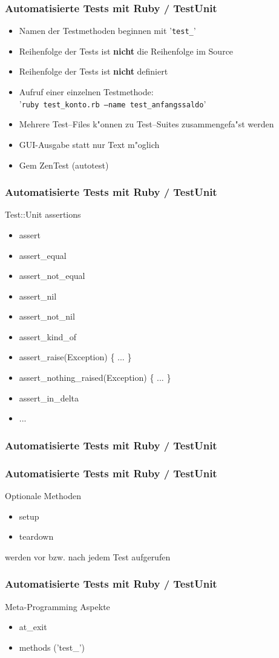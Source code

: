 \documentclass{beamer}
\begin{document}
\begin{frame}
  \frametitle{Automatisierte Tests mit Ruby / TestUnit}
  \begin{itemize}
    \item Namen der Testmethoden beginnen mit '\texttt{test\_}'
    \item Reihenfolge der Tests ist {\bf nicht} die Reihenfolge im Source
    \item Reihenfolge der Tests ist {\bf nicht} definiert
    \item Aufruf einer einzelnen Testmethode:\\ '\texttt{ruby test\_konto.rb --name test\_anfangssaldo}'
    \item Mehrere Test--Files k"onnen zu Test--Suites zusammengefa"st werden
    \item GUI-Ausgabe statt nur Text m"oglich
    \item Gem ZenTest (autotest)
  \end{itemize}
\end{frame}

\begin{frame}
  \frametitle{Automatisierte Tests mit Ruby / TestUnit}
  Test::Unit assertions
  \begin{itemize}
    \item assert
    \item assert\_equal
    \item assert\_not\_equal
    \item assert\_nil
    \item assert\_not\_nil
    \item assert\_kind\_of
    \item assert\_raise(Exception) \{ ... \}
    \item assert\_nothing\_raised(Exception) \{ ... \}
    \item assert\_in\_delta
    \item ...
  \end{itemize}
\end{frame}

\begin{frame}[containsverbatim]
  \frametitle{Automatisierte Tests mit Ruby / TestUnit}
  
\end{frame}

\begin{frame}
  \frametitle{Automatisierte Tests mit Ruby / TestUnit}
Optionale Methoden 
\begin{itemize}
  \item setup
  \item teardown
\end{itemize}
werden vor bzw. nach jedem Test aufgerufen
\end{frame}

\begin{frame}
  \frametitle{Automatisierte Tests mit Ruby / TestUnit}
  Meta-Programming Aspekte
  \begin{itemize}
    \item at\_exit
    \item methods ('test\_')
  \end{itemize}
\end{frame}

\end{document}

